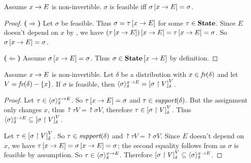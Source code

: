 \begin{lemma} \label{thm:pp:assign:nifeasible} Assume $ x \rightarrow E $ is non-invertible. $ \sigma $
is feasible iff $ \sigma \left[ x \rightarrow E \right] = \sigma $.
\end{lemma}

\begin{proof} \textbf{($\Rightarrow$)} Let $ \sigma $ be
feasible. Thus $ \sigma = \tau \left[ x \rightarrow E \right] $ for some
$ \tau \in \textbf{State} $. Since $ E $ doesn't depend on $ x $
by , we have
$ \left( \tau \left[ x \rightarrow E \right] \right) \left[ x \rightarrow E \right] = \tau \left[ x \rightarrow E \right]
= \sigma $. So $ \sigma \left[ x \rightarrow E \right] = \sigma $.

\textbf{($\Leftarrow$)} Assume $ \sigma \left[ x \rightarrow E \right] = \sigma
$. Thus $ \sigma \in \textbf{State} \left[ x \rightarrow E \right] $ by definition.
\end{proof}

\begin{lemma} \label{thm:pp:assign:eqproject} Assume $ x \rightarrow E $ is non-invertible. Let
$ \delta $ be a distribution with $ x \in \textit{fv}(\delta) $ and let $ V =
\textit{fv}(\delta) - \left\{ x \right\} $. If $ \sigma
$ is feasible, then $ \langle \sigma \rangle^{x \rightarrow E}_\delta
= \left[ \sigma \upharpoonright V \right]_{\delta}^{V} $.

\end{lemma}

\begin{proof} Let $ \tau \in \langle \sigma \rangle^{x \rightarrow E}_\delta $. So
$ \tau \left[ x \rightarrow E \right] = \sigma $ and $ \tau \in \textit{support}(\delta)
$. But the assignment only changes $ x $, thus $ \project{\tau}{V}
= \project{\sigma}{V} $, therefore
$ \tau \in \left[ \sigma \upharpoonright V \right]_{\delta}^{V} $. Thus
$ \langle \sigma \rangle^{x \rightarrow E}_\delta \subseteq \left[ \sigma \upharpoonright V \right]_{\delta}^{V} $.

Let $ \tau \in \left[ \sigma \upharpoonright V \right]_{\delta}^{V} $. So
$ \tau \in \textit{support}(\delta) $ and $ \project{\tau}{V}
= \project{\sigma}{V} $. Since $ E $ doesn't depend on $ x $, we have
$ \tau \left[ x \rightarrow E \right] = \sigma \left[ x \rightarrow E \right] = \sigma $; the second
equality follows from  as $ \sigma $ is
feasible by assumption. So
$ \tau \in \langle \sigma \rangle^{x \rightarrow E}_\delta $. Therefore
$ \left[ \sigma \upharpoonright V \right]_{\delta}^{V} \subseteq \langle \sigma \rangle^{x \rightarrow E}_\delta
$.

\end{proof}

